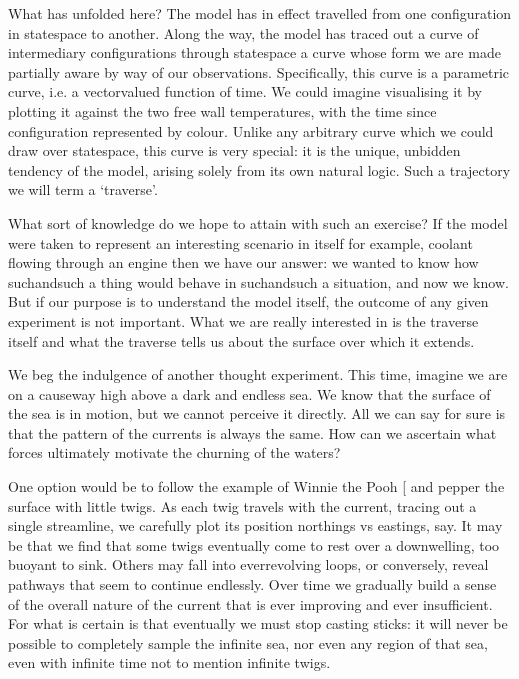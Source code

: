 \documentclass[letterpaper,10pt,english]{jupyterBook}
\begin{document}
\sphinxAtStartPar
What has unfolded here? The model has in effect travelled from one configuration in state\sphinxhyphen{}space to another. Along the way, the model has traced out a curve of intermediary configurations through state\sphinxhyphen{}space \sphinxhyphen{} a curve whose form we are made partially aware by way of our observations. Specifically, this curve is a parametric curve, i.e. a vector\sphinxhyphen{}valued function of time. We could imagine visualising it by plotting it against the two free wall temperatures, with the time since configuration represented by colour. Unlike any arbitrary curve which we could draw over state\sphinxhyphen{}space, this curve is very special: it is the unique, unbidden tendency of the model, arising solely from its own natural logic. Such a trajectory we will term a ‘traverse’.

\sphinxAtStartPar
What sort of knowledge do we hope to attain with such an exercise? If the model were taken to represent an interesting scenario in itself \sphinxhyphen{} for example, coolant flowing through an engine \sphinxhyphen{} then we have our answer: we wanted to know how such\sphinxhyphen{}and\sphinxhyphen{}such a thing would behave in such\sphinxhyphen{}and\sphinxhyphen{}such a situation, and now we know. But if our purpose is to understand the model itself, the outcome of any given experiment is not important. What we are really interested in is the traverse itself \sphinxhyphen{} and what the traverse tells us about the surface over which it extends.

\sphinxAtStartPar
We beg the indulgence of another thought experiment. This time, imagine we are on a causeway high above a dark and endless sea. We know that the surface of the sea is in motion, but we cannot perceive it directly. All we can say for sure is that the pattern of the currents is always the same. How can we ascertain what forces ultimately motivate the churning of the waters?

\sphinxAtStartPar
One option would be to follow the example of Winnie the Pooh {[}\sphinxcite{references:id56}{]} and pepper the surface with little twigs. As each twig travels with the current, tracing out a single streamline, we carefully plot its position \sphinxhyphen{} northings vs eastings, say. It may be that we find that some twigs eventually come to rest over a downwelling, too buoyant to sink. Others may fall into ever\sphinxhyphen{}revolving loops, or conversely, reveal pathways that seem to continue endlessly. Over time we gradually build a sense of the overall nature of the current that is ever improving \sphinxhyphen{} and ever insufficient. For what is certain is that eventually we must stop casting sticks: it will never be possible to completely sample the infinite sea, nor even any region of that sea, even with infinite time \sphinxhyphen{} not to mention infinite twigs.
\end{document}
